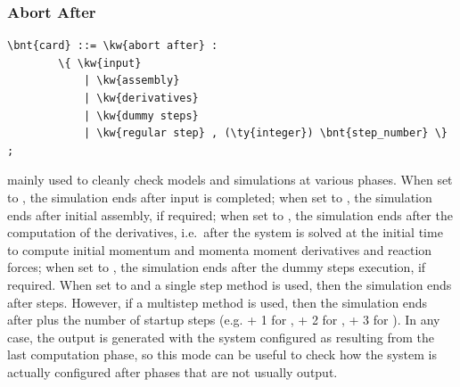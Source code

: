 \subsubsection{Abort After}
\label{sec:IVP:abort after}
\begin{Verbatim}[commandchars=\\\{\}]
    \bnt{card} ::= \kw{abort after} :
        \{ \kw{input} 
            | \kw{assembly}
            | \kw{derivatives}
            | \kw{dummy steps}
            | \kw{regular step} , (\ty{integer}) \bnt{step_number} \} ;
\end{Verbatim}
mainly used to cleanly check models and simulations at various phases.
When set to , the simulation ends after input is completed;
when set to , the simulation ends after initial assembly,
if required;
when set to , the simulation ends after the computation
of the derivatives, i.e.\ after the system is solved at the initial
time to compute initial momentum and momenta moment derivatives and 
reaction forces;
when set to , the simulation ends after the dummy steps
execution, if required.
When set to  and a single step method is used,
then the simulation ends after  steps.
However, if a multistep method is used, then the simulation ends after
 plus the number of startup steps (e.g. 
+ 1 for ,  + 2 for , 
+ 3 for ).
In any case, the output is generated with the system configured 
as resulting from the last computation phase, so this mode can be useful 
to check how the system is actually configured after phases that are not 
usually output.


